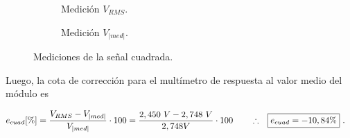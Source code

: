       \begin{figure}[H]
        \centering
        \begin{subfigure}[ht]{0.48\textwidth}
          \caption{Medición $V_{RMS}$.}
          \label{fig:MedicionVrmsCuadrada}
        \end{subfigure}
        \hfill 
        \begin{subfigure}[ht]{0.48\textwidth}
          \caption{Medición $V_{|med|}$.}
          \label{fig:MedicionVmedCuadrada}
        \end{subfigure}
        \caption{Mediciones de la señal cuadrada.}
         \label{fig:MedicionSeñalCuadrada}
      \end{figure}


      Luego, la cota de corrección para el multímetro de respuesta al valor medio del módulo es

      \begin{align*}
        e_{cuad} [\%] = \dfrac{V_{RMS} - V_{|med|}}{V_{|med|}} \cdot 100
               = \dfrac{2,450~V - 2,748~V}{2,748V} \cdot 100
               \hspace{20pt} \therefore \hspace{10pt} \Aboxed{e_{cuad} = -10,84\%}~.
      \end{align*}


